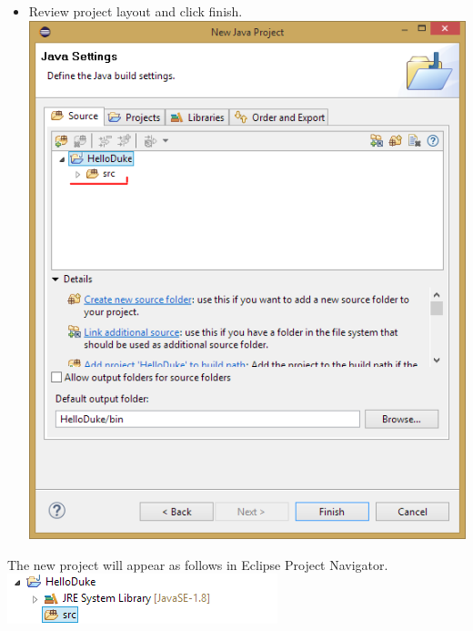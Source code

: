 \documentclass[10pt,landscape,a4paper]{article}
\begin{document}
\begin{multicols}{2}
\begin{multicols}{2}
\begin{itemize}
\item Review project layout and click finish. \includegraphics[width=1\linewidth]{../slides/EclipseProjectWizard2.png}
\end{itemize}
The new project will appear as follows in Eclipse Project Navigator.
\includegraphics[width=.9\linewidth]{../slides/EclipseProjectExplorerNewProject1.png}
\end{multicols}

\end{multicols}
\end{document}
